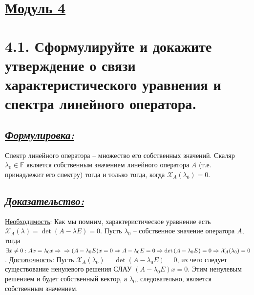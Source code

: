 \documentclass{article}
\begin{document}
\newpage
{}
\section*{\LARGE\centering \underline{Модуль 4}}

\section*{\LARGE 4.1. Сформулируйте и докажите утверждение о связи характеристического уравнения и спектра линейного оператора.  }
\subsection*{\Large \underline{\textit{Формулировка: }}}
Спектр линейного оператора -- множество его собственных значений.
\newline Скаляр $\lambda_0 \in \mathbb{F}$ является собственным значением линейного оператора $A$ (т.е. принадлежит его спектру) тогда и только тогда, когда $\mathcal{X}_A(\lambda_0) = 0$.

\subsection*{\Large \underline{\textit{Доказательство: }}}
\underline{Необходимость}:
\newline Как мы помним, характеристическое уравнение есть $\mathcal{X}_A(\lambda) = \det{(A - \lambda E)} = 0$. Пусть $\lambda_0$ -- собственное значение оператора $A$, тогда $\exists x \ne 0 : Ax = \lambda_0 x \Rightarrow \newline \Rightarrow (A - \lambda_0 E)x = 0 \Rightarrow A - \lambda_0 E = 0 \Rightarrow \det{(A - \lambda_0 E)} = 0 \Rightarrow \mathcal{X}_A(\lambda_0) = 0$.
\newline \underline{Достаточность}:
\newline Пусть $\mathcal{X}_A(\lambda_0) = \det{(A - \lambda_0 E)} = 0$, из чего следует существование ненулевого решения СЛАУ $(A - \lambda_0 E)x = 0$. Этим ненулевым решением и будет собственный вектор, а $\lambda_0$, следовательно, является собственным значением.

\end{document}
